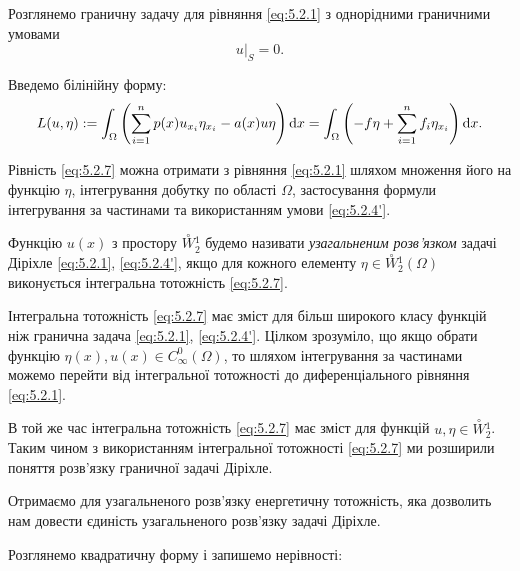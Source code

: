 Розглянемо граничну задачу для рівняння \eqref{eq:5.2.1} з однорідними граничними умовами
\begin{equation}
    \label{eq:5.2.4'}
    \left. u \right|_S = 0.
\end{equation}

Введемо білінійну форму:
\begin{equation}
    \label{eq:5.2.7}
    L(u, \eta) := \int_\Omega \left( \sum_{i=1}^n p(x) u_{x_i} \eta_{x_i} - a(x)u\eta \right) \mathop{}\!\mathrm{d} x = \int_\Omega \left( -f\eta + \sum_{i=1}^n f_i \eta_{x_i} \right) \mathop{}\!\mathrm{d} x.
\end{equation}

Рівність \eqref{eq:5.2.7} можна отримати з рівняння \eqref{eq:5.2.1} шляхом множення його на функцію $\eta$, інтегрування добутку по області $\Omega$, застосування формули інтегрування за частинами та використанням умови \eqref{eq:5.2.4'}.

\begin{definition}
    Функцію $u(x)$ з простору $\overset{\circ}{W} {}_2^1$ будемо називати \emph{узагальненим розв'язком} задачі Діріхле \eqref{eq:5.2.1}, \eqref{eq:5.2.4'}, якщо для кожного елементу $\eta \in \overset{\circ}{W} {}_2^1(\Omega)$ виконується інтегральна тотожність \eqref{eq:5.2.7}.
\end{definition}

Інтегральна тотожність \eqref{eq:5.2.7} має зміст для більш широкого класу функцій ніж гранична задача \eqref{eq:5.2.1}, \eqref{eq:5.2.4'}. Цілком зрозуміло, що якщо обрати функцію $\eta(x), u(x) \in C_\infty^0(\Omega)$, то шляхом інтегрування за частинами можемо перейти від інтегральної тотожності до диференціального рівняння \eqref{eq:5.2.1}. \medskip

В той же час інтегральна тотожність \eqref{eq:5.2.7} має зміст для функцій $u, \eta \in \overset{\circ}{W} {}_2^1$. Таким чином з використанням інтегральної тотожності \eqref{eq:5.2.7} ми розширили поняття розв'язку граничної задачі Діріхле. \medskip

Отримаємо для узагальненого розв'язку енергетичну тотожність, яка дозволить нам довести єдиність узагальненого розв'язку задачі Діріхле. \medskip

Розглянемо квадратичну форму і запишемо нерівності:

